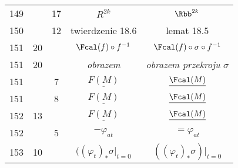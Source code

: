 \documentclass[a4paper,11pt]{article}
\numberwithin{equation}{section}
\begin{document}
\begin{center}
\begin{tabular}{|c|c|c|c|c|}
    149 & & 17 & $R^{ 2k }$ & $\Rbb^{ 2k }$ \\
    150 & & 12 & twierdzenie 18.6 & lemat 18.5 \\
    151 & 20 & & $\Fcal( f ) \circ f^{ -1 }$
           & $\Fcal( f ) \circ \sigma \circ f^{ -1 }$ \\
    151 & 20 & & \textit{obrazem} & \textit{obrazem przekroju} $\sigma$ \\
    151 & & \hphantom{0}7 & $\underline{ F( M ) }$
    & $\underline{ \Fcal( M ) }$ \\
    151 & & \hphantom{0}8 & $\underline{ F( M ) }$
           & $\underline{ \Fcal( M ) }$ \\
    152 & 13 & & $\underline{ F( M ) }$ & $\underline{ \Fcal( M ) }$ \\
    152 & & \hphantom{0}5 & $-\varphi_{ a t }$ & $= \varphi_{ a t }$ \\
    153 & 10 & & $( ( \varphi_{ t } )_{ * } \sigma \bigg|_{ t = 0 }$
           & $( ( \varphi_{ t } )_{ * } \sigma )\bigg|_{ t = 0 }$ \\
    \hline
  \end{tabular}





  \newpage


\end{center}
\end{document}
